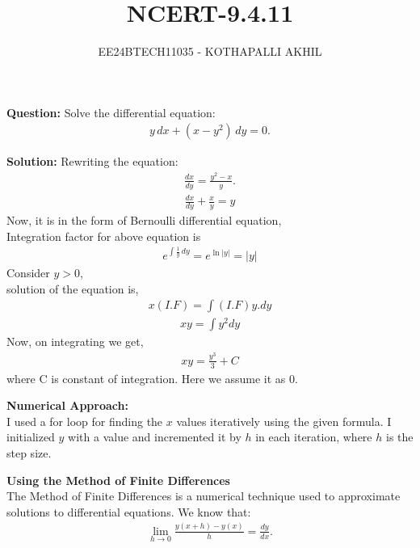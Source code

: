 \documentclass[article]{IEEEtran}
\numberwithin{figure}{enumi}
\begin{document}

\title{NCERT-9.4.11}
\author{EE24BTECH11035 - KOTHAPALLI AKHIL}
{\let\newpage\relax\maketitle}

\noindent\textbf{Question: }  
Solve the differential equation:  
\begin{align}
    y \, dx + (x - y^2) \, dy = 0.
\end{align}

\noindent\textbf{Solution:}  
Rewriting the equation:  
\begin{align}
    \frac{dx}{dy} = \frac{y^2 - x}{y}.
\end{align}
\begin{align}
    \frac{dx}{dy}+\frac{x}{y}=y
\end{align}
Now, it is in the form of Bernoulli differential equation,\\
Integration factor for above equation is
\begin{align}
  e^{\int \frac{1}{y} \, dy} = e^{\ln |y|}=|y|
\end{align}
Consider $y>0$, \\
solution of the equation is,
\begin{align}
    x(I.F)=\int{(I.F)y.dy}
\end{align}
\begin{align}
    xy=\int{y^2dy}
\end{align}
Now, on integrating we get,\\
\begin{align}
    xy=\frac{y^3}{3}+C
\end{align}
where C is constant of integration. Here we assume it as 0.\\
\vspace{0.5em}  

\noindent\textbf{Numerical Approach:}\\ 
I used a for loop for finding the $x$ values iteratively using the given formula. I initialized $y$ with a value and incremented it by $h$ in each iteration, where $h$ is the step size.  

\textbf{Using the Method of Finite Differences}\\ 
The Method of Finite Differences is a numerical technique used to approximate solutions to differential equations.  
We know that:  
\begin{align}
    \lim_{h \to 0} \frac{y(x+h) - y(x)}{h} = \frac{dy}{dx}.
\end{align}
\end{document}
